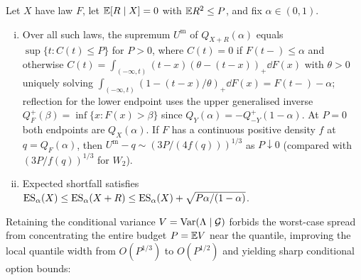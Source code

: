 \begin{proposition}\label{prop:martingale}
Let $X$ have law $F$, let $\mathbb{E}[R\mid X]=0$ with $\mathbb{E} R^2\le P$, and fix $\alpha\in(0,1)$.
\begin{enumerate}[(i)]
\item Over all such laws, the supremum $U^{\mathrm{m}}$ of $Q_{X+R}(\alpha)$ equals $\sup\{t:C(t)\le P\}$
  for $P>0$, where $C(t)=0$ if $F(t-)\le\alpha$ and otherwise
  $C(t)=\int_{(-\infty,t)}(t-x)(\theta-(t-x))_+\dd F(x)$ with $\theta>0$ uniquely solving
  $\int_{(-\infty,t)}(1-(t-x)/\theta)_+\dd F(x)=F(t-)-\alpha$; reflection for the lower endpoint uses the upper generalised inverse
  $Q^+_F(\beta)=\inf\{x:F(x)>\beta\}$ since $Q_Y(\alpha)=-Q^+_{-Y}(1-\alpha)$.
  At $P=0$ both endpoints are $Q_X(\alpha)$. If $F$ has a continuous positive density $f$ at $q=Q_F(\alpha)$, then
  $U^{\mathrm{m}}-q\sim(3P/(4f(q)))^{1/3}$ as $P\downarrow0$ (compared with $(3P/f(q))^{1/3}$ for $W_2$).
\item Expected shortfall satisfies $\operatorname{ES}_\alpha(X)\le\operatorname{ES}_\alpha(X+R)\le\operatorname{ES}_\alpha(X)+\sqrt{P\alpha/(1-\alpha)}$.
\end{enumerate}
\end{proposition}

Retaining the conditional variance $V=\operatorname{Var}(\Lambda\mid\mathcal{G})$ forbids the worst-case spread from
concentrating the entire budget $P=\mathbb{E} V$ near the quantile, improving the local quantile width from
$O(P^{1/3})$ to $O(P^{1/2})$ and yielding sharp conditional option bounds:

